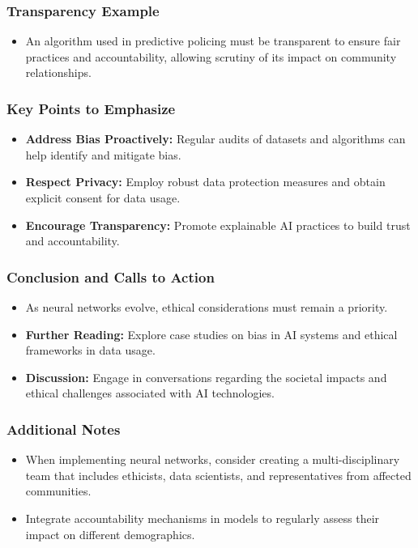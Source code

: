 \documentclass[aspectratio=169]{beamer}
\begin{document}
\begin{frame}[fragile]
    \frametitle{Transparency Example}
    \begin{itemize}
        \item An algorithm used in predictive policing must be transparent to ensure fair practices and accountability, allowing scrutiny of its impact on community relationships.
    \end{itemize}
\end{frame}

\begin{frame}[fragile]
    \frametitle{Key Points to Emphasize}
    \begin{itemize}
        \item \textbf{Address Bias Proactively:} Regular audits of datasets and algorithms can help identify and mitigate bias.
        \item \textbf{Respect Privacy:} Employ robust data protection measures and obtain explicit consent for data usage.
        \item \textbf{Encourage Transparency:} Promote explainable AI practices to build trust and accountability.
    \end{itemize}
\end{frame}

\begin{frame}[fragile]
    \frametitle{Conclusion and Calls to Action}
    \begin{itemize}
        \item As neural networks evolve, ethical considerations must remain a priority.
        \item \textbf{Further Reading:} Explore case studies on bias in AI systems and ethical frameworks in data usage.
        \item \textbf{Discussion:} Engage in conversations regarding the societal impacts and ethical challenges associated with AI technologies.
    \end{itemize}
\end{frame}

\begin{frame}[fragile]
    \frametitle{Additional Notes}
    \begin{itemize}
        \item When implementing neural networks, consider creating a multi-disciplinary team that includes ethicists, data scientists, and representatives from affected communities.
        \item Integrate accountability mechanisms in models to regularly assess their impact on different demographics.
    \end{itemize}
\end{frame}
\end{document}
